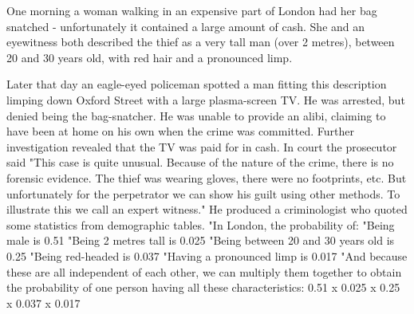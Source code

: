 One morning a woman walking in an expensive part of London had her bag snatched - unfortunately it contained a large amount of cash. She and an eyewitness both described the thief as a very tall man (over 2 metres), between 20 and 30 years old, with red hair and a pronounced limp.

Later that day an eagle-eyed policeman spotted a man fitting this description limping down Oxford Street with a large plasma-screen TV. He was arrested, but denied being the bag-snatcher. He was unable to provide an alibi, claiming to have been at home on his own when the crime was committed. Further investigation revealed that the TV was paid for in cash.
In court the prosecutor said "This case is quite unusual. Because of the nature of the crime, there is no forensic evidence. The thief was wearing gloves, there were no footprints, etc. But unfortunately for the perpetrator we can show his guilt using other methods. To illustrate this we call an expert witness."
He produced a criminologist who quoted some statistics from demographic tables. "In London, the probability of:
"Being male  is  0.51 
"Being 2 metres tall  is  0.025 
"Being between 20 and 30 years old  is  0.25 
"Being red-headed  is  0.037 
"Having a pronounced limp  is  0.017 
"And because these are all independent of each other, we can multiply them together to obtain the probability of one person having all these characteristics:
 0.51 
x  0.025 
x  0.25 
x  0.037 
x  0.017 
 
